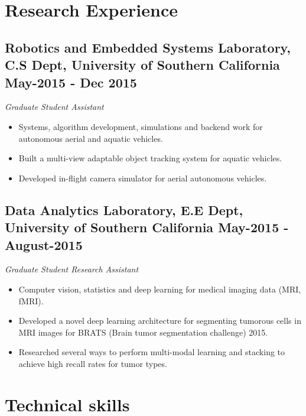 \documentclass[10pt,letterpaper,sans]{moderncv}        %
\begin{document}
\begin{small}
\begin{itemize}
\end{itemize}
\end{small}

\section{Research Experience}
\vspace{2pt}

\subsection{\textbf{Robotics and Embedded Systems Laboratory}, C.S Dept, University of Southern California \small{May-2015 - Dec 2015}}
\textit{Graduate Student Assistant}\\
\begin {small}
\begin{itemize}
\item Systems, algorithm development, simulations and backend work for autonomous aerial and aquatic vehicles.
\item Built a multi-view adaptable object tracking system for aquatic vehicles.
\item Developed in-flight camera simulator for aerial autonomous vehicles.
\end{itemize}
\end{small}

\subsection{\textbf{Data Analytics Laboratory}, E.E Dept, University of Southern California \small{May-2015 - August-2015}}
\textit{Graduate Student Research Assistant}\\
\begin {small}
\begin {itemize}
\item Computer vision, statistics and deep learning for medical imaging data (MRI, fMRI).
\item Developed a novel deep learning architecture for segmenting tumorous cells in MRI images for BRATS (Brain tumor segmentation challenge) 2015.
\item Researched several ways to perform multi-modal learning and stacking to achieve high recall rates for tumor types.
\end {itemize}
\end{small}

\section{Technical skills}
\end{document}
